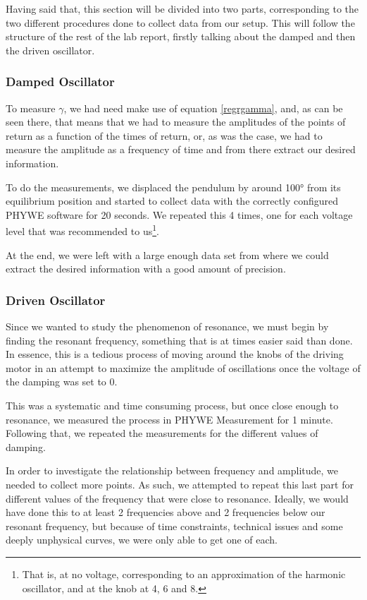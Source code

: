 \documentclass[a4paper,12pt]{article}
\begin{document}
Having said that, this section will be divided into two parts, corresponding to the two different procedures done to collect data from our setup. This will follow the structure of the rest of the lab report, firstly talking about the damped and then the driven oscillator. 

\subsubsection{Damped Oscillator}
To measure $\gamma$, we had need make use of equation \ref{regrgamma}, and, as can be seen there, that means that we had to measure the amplitudes of the points of return as a function of the times of return, or, as was the case, we had to measure the amplitude as a frequency of time and from there extract our desired information.

To do the measurements, we displaced the pendulum by around 100° from its equilibrium position and started to collect data with the correctly configured PHYWE software for 20 seconds. We repeated this 4 times, one for each voltage level that was recommended to us\footnote{That is, at no voltage, corresponding to an approximation of the harmonic oscillator, and at the knob at 4, 6 and 8.}.

At the end, we were left with a large enough data set from where we could extract the desired information with a good amount of precision.

\subsubsection{Driven Oscillator}
Since we wanted to study the phenomenon of resonance, we must begin by finding the resonant frequency, something that is at times easier said than done. In essence, this is a tedious process of moving around the knobs of the driving motor in an attempt to maximize the amplitude of oscillations once the voltage of the damping was set to 0. 

This was a systematic and time consuming process, but once close enough to resonance, we measured the process in PHYWE Measurement for 1 minute. Following that, we repeated the measurements for the different values of damping. 

In order to investigate the relationship between frequency and amplitude, we needed to collect more points. As such, we attempted to repeat this last part for different values of the frequency that were close to resonance. Ideally, we would have done this to at least 2 frequencies above and 2 frequencies below our resonant frequency, but because of time constraints, technical issues and some deeply unphysical curves, we were only able to get one of each. 
\end{document}
